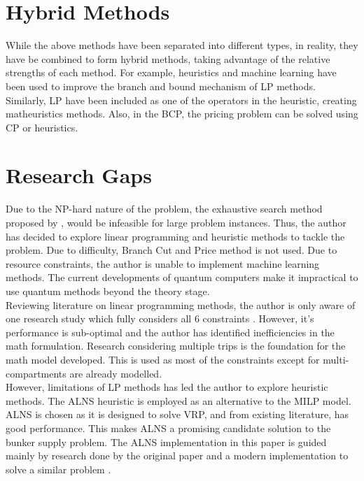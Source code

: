 \section{Hybrid Methods}
While the above methods have been separated into different types, in reality, they have be combined to form hybrid methods, taking advantage of the relative strengths of each method. For example, heuristics and machine learning \cite{huang_branch_2021} have been used to improve the branch and bound mechanism of LP methods. Similarly, LP \cite{schmid_hybridization_2010} have been included as one of the operators in the heuristic, creating matheuristics methods. Also, in the BCP, the pricing problem can be solved using CP \cite{gualandi_constraint_2013} or heuristics.


\section{Research Gaps}
Due to the NP-hard nature of the problem, the exhaustive search method proposed by \cite{wang_optimization_2019}, \cite{ho_development_nodate} would be infeasible for large problem instances. %
Thus, the author has decided to explore linear programming and heuristic methods to tackle the problem. Due to difficulty, Branch Cut and Price method is not used. Due to resource constraints, the author is unable to implement machine learning methods. The current developments of quantum computers make it impractical to use quantum methods beyond the theory stage. \\

Reviewing literature on linear programming methods, the author is only aware of one research study which fully considers all 6 constraints \cite{corman_decision_2015}. However, it's performance is sub-optimal and the author has identified inefficiencies in the math formulation. Research considering multiple trips \cite{cattaruzza_vehicle_2018} is the foundation for the math model developed. This is used as most of the constraints except for multi-compartments are already modelled. \\

However, limitations of LP methods has led the author to explore heuristic methods. The ALNS heuristic is employed as an alternative to the MILP model. ALNS is chosen as it is designed to solve VRP, and from existing literature, has good performance. This makes ALNS a promising candidate solution to the bunker supply problem. The ALNS implementation in this paper is guided mainly by research done by the original paper \cite{ropke_adaptive_2006} and a modern implementation to solve a similar problem \cite{yu_adaptive_2024}.
